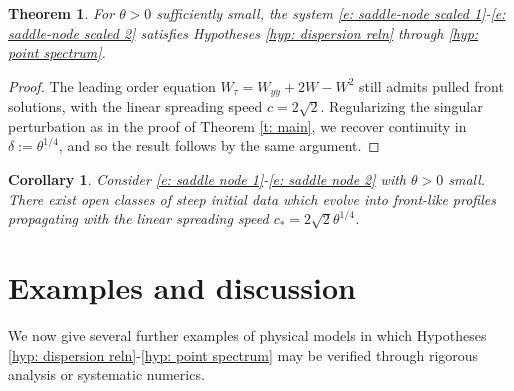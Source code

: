 \documentclass[11pt]{article}
\newtheorem{corollary}[prop]{Corollary}
\newtheorem{thmlocal}[prop]{Theorem}
\numberwithin{equation}{section}
\numberwithin{prop}{section}
\begin{document}
\begin{thmlocal}\label{t: saddle-node}
	For $\theta > 0$ sufficiently small, the system \eqref{e: saddle-node scaled 1}-\eqref{e: saddle-node scaled 2} satisfies Hypotheses \ref{hyp: dispersion reln} through \ref{hyp: point spectrum}. 
\end{thmlocal}
\begin{proof}
	The leading order equation $W_\tau = W_{yy} + 2W - W^2$ still admits pulled front solutions, with the linear spreading speed $c = 2 \sqrt{2}$. Regularizing the singular perturbation as in the proof of Theorem \ref{t: main}, we recover continuity in $\delta := \theta^{1/4}$, and so the result follows by the same argument. 
\end{proof}

\begin{corollary}
	Consider \eqref{e: saddle node 1}-\eqref{e: saddle node 2} with $\theta > 0$ small. There exist open classes of steep initial data which evolve into front-like profiles propagating with the linear spreading speed $c_* = 2\sqrt{ 2} \theta^{1/4}$. 
\end{corollary}

\section{Examples and discussion}\label{s: discussion} 
We now give several further examples of physical models in which Hypotheses \ref{hyp: dispersion reln}-\ref{hyp: point spectrum} may be verified through rigorous analysis or systematic numerics. 
\end{document}
